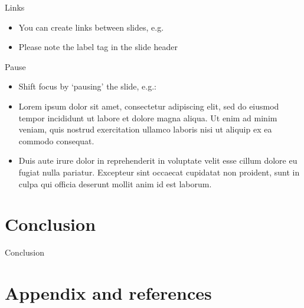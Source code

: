 \documentclass[aspectratio=169]{beamer}  %
\begin{document}
\begin{frame}[label=links]{Links}
\begin{itemize}
    \item You can create links between slides, e.g. \hyperlink{descriptives}{}
    \item Please note the label tag in the slide header
\end{itemize}
\end{frame}


\begin{frame}{Pause}
\begin{itemize}
    \item Shift focus by `pausing' the slide, e.g.:
    \bigskip\pause
    \item Lorem ipsum dolor sit amet, consectetur adipiscing elit, sed do eiusmod tempor incididunt ut labore et dolore magna aliqua. Ut enim ad minim veniam, quis nostrud exercitation ullamco laboris nisi ut aliquip ex ea commodo consequat.
    \bigskip\pause
    \item Duis aute irure dolor in reprehenderit in voluptate velit esse cillum dolore eu fugiat nulla pariatur. Excepteur sint occaecat cupidatat non proident, sunt in culpa qui officia deserunt mollit anim id est laborum.
\end{itemize}
\end{frame}


\section{Conclusion}


\begin{frame}{Conclusion}
\end{frame}



\section{Appendix and references}
\end{document}

